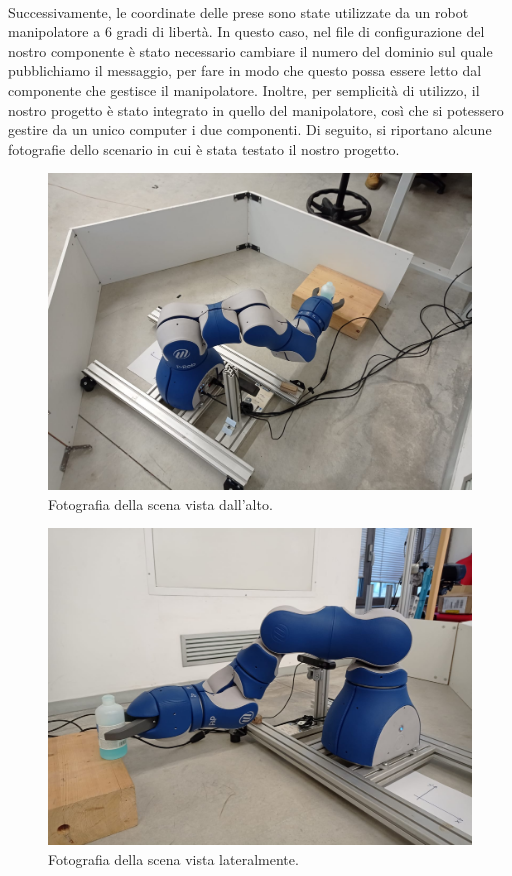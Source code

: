 \documentclass{report}
\begin{document}
\\Successivamente, le coordinate delle prese sono state utilizzate da un robot manipolatore a 6 gradi di libertà. In questo caso, nel file di configurazione del nostro componente è stato necessario cambiare il numero del dominio sul quale pubblichiamo il messaggio, per fare in modo che questo possa essere letto dal componente che gestisce il manipolatore. Inoltre, per semplicità di utilizzo, il nostro progetto è stato integrato in quello del manipolatore, così che si potessero gestire da un unico computer i due componenti. Di seguito, si riportano alcune fotografie dello scenario in cui è stata testato il nostro progetto.
\begin{figure}[h!]
	\centering
	\includegraphics[width=\textwidth]{immagini/manipAlto}
	\caption{Fotografia della scena vista dall'alto.}
	\label{figura:manipAlto}
\end{figure}
\begin{figure}[h!]
	\centering
	\includegraphics[width=\textwidth]{immagini/manipDavanti2}
	\caption{Fotografia della scena vista lateralmente.}
	\label{figura:manipDavanti}
\end{figure}
\end{document}
